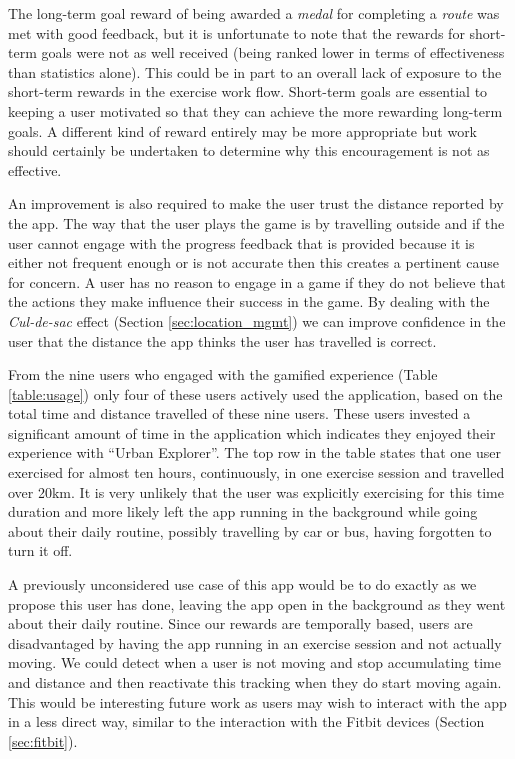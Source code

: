 The long-term goal reward of being awarded a \emph{medal} for
completing a \emph{route} was met with good feedback, but it is
unfortunate to note that the rewards for short-term goals were not as
well received (being ranked lower in terms of effectiveness than
statistics alone). This could be in part to an overall lack of
exposure to the short-term rewards in the exercise work
flow. Short-term goals are essential to keeping a user motivated so
that they can achieve the more rewarding long-term goals. A different
kind of reward entirely may be more appropriate but work should
certainly be undertaken to determine why this encouragement is not as
effective. 

An improvement is also required to make the user trust the distance
reported by the app. The way that the user plays the game is by
travelling outside and if the user cannot engage with the progress
feedback that is provided because it is either not frequent enough or
is not accurate then this creates a pertinent cause for concern. A
user has no reason to engage in a game if they do not believe that the
actions they make influence their success in the game. By dealing with
the \emph{Cul-de-sac} effect (Section \ref{sec:location_mgmt}) we can
improve confidence in the user that the distance the app thinks the
user has travelled is correct. 

From the nine users who engaged with the gamified experience (Table
\ref{table:usage}) only four of these users actively used the
application, based on the total time and distance travelled of these
nine users. These users invested a significant amount of time in the
application which indicates they enjoyed their experience with
``Urban Explorer''. The top row in the table states that one user
exercised for almost ten hours, continuously, in one exercise session
and travelled over 20km. It is very unlikely that the user was
explicitly exercising for this time duration and more likely left the
app running in the background while going about their daily routine,
possibly travelling by car or bus, having forgotten to turn it
off. 

A previously unconsidered use case of this app would be to do
exactly as we propose this user has done, leaving the app open in
the background as they went about their daily routine. Since our
rewards are temporally based, users are disadvantaged by having the
app running in an exercise session and not actually moving. We could
detect when a user is not moving and stop accumulating time and
distance and then reactivate this tracking when they do start moving
again. This would be interesting future work as users may wish to
interact with the app in a less direct way, similar to the interaction
with the Fitbit devices (Section \ref{sec:fitbit}).

